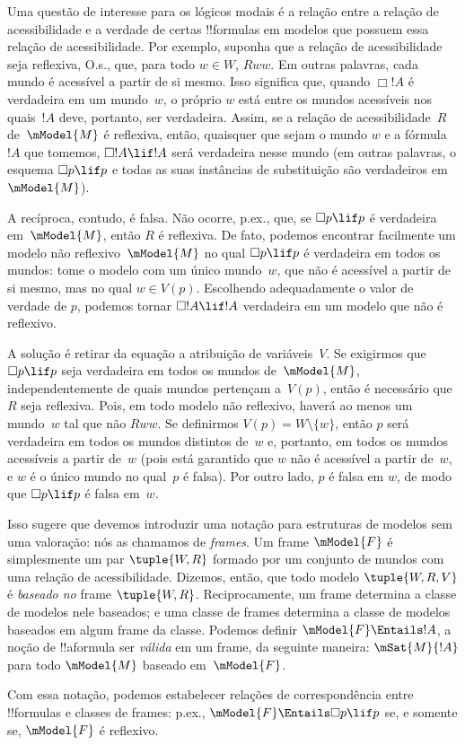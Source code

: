 \documentclass[../../../include/open-logic-section]{subfiles}
\begin{document}


Uma questão de interesse para os lógicos modais é a relação entre a relação
de acessibilidade e a verdade de certas !!{formula}s em modelos que possuem
essa relação de acessibilidade. Por exemplo, suponha que a relação de
acessibilidade seja reflexiva, O.s.\@, que, para todo $w \in W$, $Rww$. Em
outras palavras, cada mundo é acessível a partir de si mesmo. Isso significa
que, quando $\Box !A$ é verdadeira em um mundo~$w$, o próprio $w$ está entre
os mundos acessíveis nos quais~$!A$ deve, portanto, ser verdadeira. Assim, se
a relação de acessibilidade~$R$ de~$\mModel{M}$ é reflexiva, então, quaisquer
que sejam o mundo $w$ e a fórmula $!A$ que tomemos, $\Box !A \lif !A$ será
verdadeira nesse mundo (em outras palavras, o esquema $\Box p \lif p$ e todas
as suas instâncias de substituição são verdadeiros em~$\mModel{M}$).

A recíproca, contudo, é falsa. Não ocorre, p.ex., que, se
$\Box p \lif p$ é verdadeira em~$\mModel{M}$, então $R$ é reflexiva. De fato,
podemos encontrar facilmente um modelo não reflexivo~$\mModel{M}$ no qual
$\Box p \lif p$ é verdadeira em todos os mundos: tome o modelo com um único
mundo~$w$, que não é acessível a partir de si mesmo, mas no qual $w \in V(p)$.
Escolhendo adequadamente o valor de verdade de $p$, podemos tornar
$\Box !A \lif !A$ verdadeira em um modelo que não é reflexivo.

A solução é retirar da equação a atribuição de variáveis~$V$. Se exigirmos
que $\Box p \lif p$ seja verdadeira em todos os mundos de~$\mModel{M}$,
independentemente de quais mundos pertençam a~$V(p)$, então é necessário que
$R$ seja reflexiva. Pois, em todo modelo não reflexivo, haverá ao menos um
mundo~$w$ tal que não $Rww$. Se definirmos $V(p) = W \setminus \{w\}$, então
$p$ será verdadeira em todos os mundos distintos de~$w$ e, portanto, em todos
os mundos acessíveis a partir de~$w$ (pois está garantido que $w$ não é
acessível a partir de~$w$, e $w$ é o único mundo no qual~$p$ é falsa). Por
outro lado, $p$ é falsa em $w$, de modo que $\Box p \lif p$ é falsa em~$w$.

Isso sugere que devemos introduzir uma notação para estruturas de modelos sem
uma valoração: nós as chamamos de \emph{frames}. Um frame $\mModel{F}$ é
simplesmente um par $\tuple{W, R}$ formado por um conjunto de mundos com uma
relação de acessibilidade. Dizemos, então, que todo modelo $\tuple{W, R, V}$
é \emph{baseado no} frame $\tuple{W, R}$. Reciprocamente, um frame determina
a classe de modelos nele baseados; e uma classe de frames determina a classe
de modelos baseados em algum frame da classe. Podemos definir
$\mModel{F} \Entails !A$, a noção de !!a{formula} ser \emph{válida} em um
frame, da seguinte maneira: $\mSat{M}{!A}$ para todo $\mModel{M}$ baseado
em~$\mModel{F}$.

Com essa notação, podemos estabelecer relações de correspondência entre
!!{formula}s e classes de frames: p.ex.,
$\mModel{F} \Entails \Box p \lif p$ se, e somente se, $\mModel{F}$ é
reflexivo.
\end{document}
